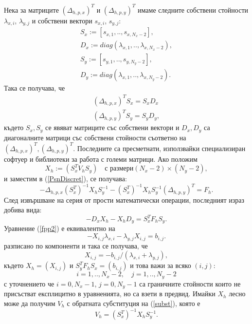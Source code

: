 \documentclass[a5paper]{article}
\newcommand{\be}{\begin{equation}}
\newcommand{\ee}{\end{equation}}
\newcommand{\rf}[1]{(\ref{#1})}
\theoremstyle{remark}
\begin{document}
\begin{large}
\iffalse
Нека за матриците $(\Delta_{h,p,x})^T$ и $(\Delta_{h,p,y})^T$ имаме следните собствени стойности $\lambda_{x,i}$, $\lambda_{y,j}$ и собствени вектори $s_{x,i}$, $s_{y,j}$:
\begin{align}
S_x:=[s_{x,1},..,s_{x,N_x-2}],\\
D_x:= diag(\lambda_{x,1},..,\lambda_{x,N_x-2}),\\
S_y:=[s_{y,1},..,s_{y,N_y-2}],\\
D_y:= diag(\lambda_{x,1},..,\lambda_{x,N_y-2}).
\end{align}
Така се получава, че
\begin{align}\label{eigIdentity}
(\Delta_{h,p,x})^T  S_x = S_x  D_x\nonumber\\
(\Delta_{h,p,y})^T   S_y = S_y  D_y,
\end{align}
където $S_x, S_y$ се явяват матриците със собствени вектори и $D_x, D_y$ са диагоналните матрици със собствени стойности съответно на $(\Delta_{h,p,x})^T, (\Delta_{h,p,y})^T$. Последните са пресметнати, използвайки специализиран софтуер и библиотеки за работа с големи матрици. Ако положим
\be\label{subst}
X_h := ( S_x^T  V_h  S_y ) \quad \text{с размери} (N_x-2)\times(N_y-2),
\ee
и заместим в \rf{PsnDiscret}, се получава:
\be
-\Delta_{h,p,x}  (S_x^T)^{-1} X_h  S_y^{-1}  -(S_x^T)^{-1} X_h  S_y^{-1}  (\Delta_{h,p,y})^T = F_h.
\ee
След извършване на серия от прости математически операции, последният израз добива вида:
\be\label{fpp2}
- D_x  X_h -X_h  D_y = S_x^T  F_h  S_y.
\ee
Уравнение \rf{fpp2} е еквивалентно на
\be\label{fpp3}
-X_{i,j} \lambda_{x,i} - \lambda_{y,j} X_{i,j} = b_{i,j}.
\ee
разписано по компоненти и така се получава, че
\be\label{fpp4}
X_{i,j} = - b_{i,j}/(\lambda_{x,i} + \lambda_{y,j} ),
\ee
където $X_h = (X_{i,j})$ и $S_y^T  F_h   S_x = (b_{i,j})$ и това важи за всяко $(i,j)$:
$$i = 1,..,N_x-2, \quad j = 1,..,N_y-2 $$
с уточнението че $i = 0,N_x-1$, $j = 0,N_y-1$ са граничните стойности които не присъстват експлицитно в уравненията, но са взети в предвид. Имайки $X_h$ лесно може да получим $V_h$  с обратната субституция на \rf{subst}, която е 
\be\label{substInv}
V_h = (S_x^T)^{-1}  X_h  S_y^{-1}.
\ee


\end{large}
\end{document}
